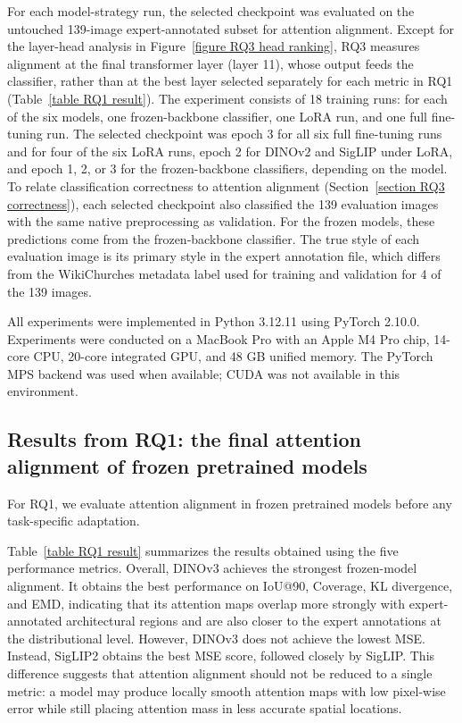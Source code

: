 \documentclass[lineno,pdflatex,sn-mathphys-num]{sn-jnl}%
\theoremstyle{thmstyleone}%
\theoremstyle{thmstyletwo}%
\theoremstyle{thmstylethree}%
\begin{document}
For each model-strategy run, the selected checkpoint was evaluated on the untouched 139-image expert-annotated subset for attention alignment. Except for the layer-head analysis in Figure~\ref{figure RQ3 head ranking}, RQ3 measures alignment at the final transformer layer (layer 11), whose output feeds the classifier, rather than at the best layer selected separately for each metric in RQ1 (Table~\ref{table RQ1 result}). The experiment consists of 18 training runs: for each of the six models, one frozen-backbone classifier, one LoRA run, and one full fine-tuning run. The selected checkpoint was epoch 3 for all six full fine-tuning runs and for four of the six LoRA runs, epoch 2 for DINOv2 and SigLIP under LoRA, and epoch 1, 2, or 3 for the frozen-backbone classifiers, depending on the model. To relate classification correctness to attention alignment (Section~\ref{section RQ3 correctness}), each selected checkpoint also classified the 139 evaluation images with the same native preprocessing as validation. For the frozen models, these predictions come from the frozen-backbone classifier. The true style of each evaluation image is its primary style in the expert annotation file, which differs from the WikiChurches metadata label used for training and validation for 4 of the 139 images.

All experiments were implemented in Python 3.12.11 using PyTorch 2.10.0. Experiments were conducted on a MacBook Pro with an Apple M4 Pro chip, 14-core CPU, 20-core integrated GPU, and 48 GB unified memory. The PyTorch MPS backend was used when available; CUDA was not available in this environment.

\subsection{Results from RQ1: the final attention alignment of frozen pretrained models}\label{section RQ1 results}

For RQ1, we evaluate attention alignment in frozen pretrained models before any task-specific adaptation.

Table~\ref{table RQ1 result} summarizes the results obtained using the five performance metrics. Overall, DINOv3 achieves the strongest frozen-model alignment. It obtains the best performance on IoU@90, Coverage, KL divergence, and EMD, indicating that its attention maps overlap more strongly with expert-annotated architectural regions and are also closer to the expert annotations at the distributional level. However, DINOv3 does not achieve the lowest MSE. Instead, SigLIP2 obtains the best MSE score, followed closely by SigLIP. This difference suggests that attention alignment should not be reduced to a single metric: a model may produce locally smooth attention maps with low pixel-wise error while still placing attention mass in less accurate spatial locations.
\end{document}
